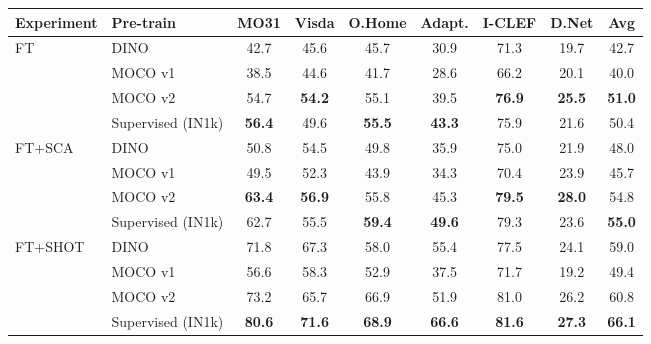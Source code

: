 \documentclass{article}
\begin{document}
\begin{table}[h!]
\begin{center}
\begin{footnotesize}
\begin{tabular}{llcccccc||c}
\toprule
\textbf{Experiment} & \textbf{Pre-train} & \textbf{MO31} &  \textbf{Visda} &  \textbf{O.Home} &  \textbf{Adapt.} &  \textbf{I-CLEF} &  \textbf{D.Net} &  \textbf{Avg}\\
\midrule
\multirow{4}{*}{FT} & DINO     &  42.7 &   45.6 &        45.7 &       30.9 &     71.3 &       19.7 & 42.7\\
                           & MOCO v1  &  38.5 &   44.6 &        41.7 &       28.6 &     66.2 &       20.1 & 40.0\\
                           & MOCO v2  &  54.7 &   \textbf{54.2} &        55.1 &       39.5 &     \textbf{76.9} &       \textbf{25.5} & \textbf{51.0}\\
                           & Supervised (IN1k)  &  \textbf{56.4} &   49.6 &        \textbf{55.5} &       \textbf{43.3} &     75.9 &       21.6 & 50.4\\
\midrule
\multirow{4}{*}{FT+SCA}    & DINO     &  50.8 &   54.5 &        49.8 &       35.9 &     75.0 &       21.9 & 48.0\\
                           & MOCO v1  &  49.5 &   52.3 &        43.9 &       34.3 &     70.4 &       23.9 & 45.7\\
                           & MOCO v2  &  \textbf{63.4} &   \textbf{56.9} &        55.8 &       45.3 &     \textbf{79.5} &       \textbf{28.0} & 54.8\\
                           & Supervised (IN1k) &  62.7 &   55.5 &        \textbf{59.4} &       \textbf{49.6} &     79.3 &       23.6 & \textbf{55.0}\\
\midrule
\multirow{4}{*}{FT+SHOT}   & DINO     &  71.8 &   67.3 &        58.0 &       55.4 &     77.5 &       24.1 & 59.0\\
                           & MOCO v1  &  56.6 &   58.3 &        52.9 &       37.5 &     71.7 &       19.2 & 49.4\\
                           & MOCO v2  &  73.2 &   65.7 &        66.9 &       51.9 &     81.0 &       26.2 & 60.8\\
                           & Supervised (IN1k)  &  \textbf{80.6} &   \textbf{71.6} &        \textbf{68.9} &       \textbf{66.6} &     \textbf{81.6} &       \textbf{27.3} & \textbf{66.1}\\
                           
\bottomrule
\end{tabular}
\end{footnotesize}
    
        \end{center}
\end{table}
\end{document}
